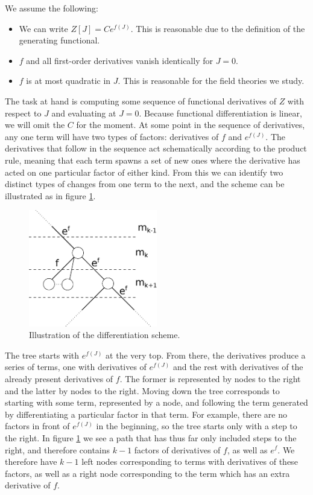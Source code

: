 We assume the following:
\begin{itemize}
	\item We can write $Z[J] = Ce^{f(J)}$. This is reasonable due to the definition of the generating functional.
	\item $f$ and all first-order derivatives vanish identically for $J = 0$.
	\item $f$ is at most quadratic in $J$. This is reasonable for the field theories we study.
\end{itemize}
The task at hand is computing some sequence of functional derivatives of $Z$ with respect to $J$ and evaluating at $J = 0$. Because functional differentiation is linear, we will omit the $C$ for the moment. At some point in the sequence of derivatives, any one term will have two types of factors: derivatives of $f$ and $e^{f(J)}$. The derivatives that follow in the sequence act schematically according to the product rule, meaning that each term spawns a set of new ones where the derivative has acted on one particular factor of either kind. From this we can identify two distinct types of changes from one term to the next, and the scheme can be illustrated as in figure \ref{fig:deriv_graph}.

\begin{figure}[!ht]
	\centering
	\includegraphics[width = 0.5\textwidth]{./Images/deriv_graph.eps}
	\caption{Illustration of the differentiation scheme.}
	\label{fig:deriv_graph}
\end{figure}

The tree starts with $e^{f(J)}$ at the very top. From there, the derivatives produce a series of terms, one with derivatives of $e^{f(J)}$ and the rest with derivatives of the already present derivatives of $f$. The former is represented by nodes to the right and the latter by nodes to the right. Moving down the tree corresponds to starting with some term, represented by a node, and following the term generated by differentiating a particular factor in that term. For example, there are no factors in front of $e^{f(J)}$ in the beginning, so the tree starts only with a step to the right. In figure \ref{fig:deriv_graph} we see a path that has thus far only included steps to the right, and therefore contains $k - 1$ factors of derivatives of $f$, as well as $e^{f}$. We therefore have $k - 1$ left nodes corresponding to terms with derivatives of these factors, as well as a right node corresponding to the term which has an extra derivative of $f$.

